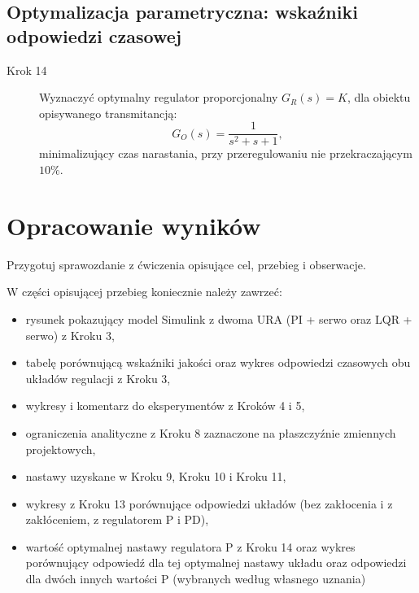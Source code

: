 \documentclass{sprawozdanie-agh}
\begin{document}
    \subsection{Optymalizacja parametryczna: wskaźniki odpowiedzi czasowej}

    \begin{description}
    \item[Krok 14] Wyznaczyć optymalny regulator proporcjonalny $G_{R}(s) = K$, dla obiektu opisywanego transmitancją:
    $$
        G_{O}(s) = \frac{1}{s^2 + s + 1},
    $$
    minimalizujący czas narastania, przy przeregulowaniu nie przekraczającym $10\%$.
    \end{description}

    \section{Opracowanie wyników}

Przygotuj sprawozdanie z ćwiczenia opisujące cel, przebieg i obserwacje.


    W części opisującej przebieg koniecznie należy zawrzeć:
    \begin{itemize}
        \item rysunek pokazujący model Simulink z dwoma URA (PI + serwo oraz LQR + serwo) z Kroku 3,
        \item tabelę porównującą wskaźniki jakości oraz wykres odpowiedzi czasowych obu układów regulacji z Kroku 3,
        \item wykresy i komentarz do eksperymentów z Kroków 4 i 5,
        \item ograniczenia analityczne z Kroku 8 zaznaczone na płaszczyźnie zmiennych projektowych,
        \item nastawy uzyskane w Kroku 9, Kroku 10 i Kroku 11,
        \item wykresy z Kroku 13 porównujące odpowiedzi układów (bez zakłocenia i z zakłóceniem, z regulatorem P i PD),
        \item wartość optymalnej nastawy regulatora P z Kroku 14 oraz wykres porównujący odpowiedź dla tej optymalnej nastawy układu oraz odpowiedzi dla dwóch innych wartości P (wybranych według własnego uznania)
    \end{itemize}
\end{document}
